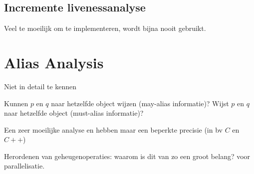\subsection{Incremente livenessanalyse}
Veel te moeilijk om te implementeren, wordt bijna nooit gebruikt.

\section{Alias Analysis}
Niet in detail te kennen

Kunnen $p$ en $q$ naar hetzelfde object wijzen (may-alias informatie)?
Wijst $p$ en $q$ naar hetzelfde object (must-alias informatie)? 

Een zeer moeilijke analyse en hebben maar een beperkte precisie (in bv $C$ en $C++$)

Herordenen van geheugenoperaties: waarom is dit van zo een groot belang? voor parallelisatie.